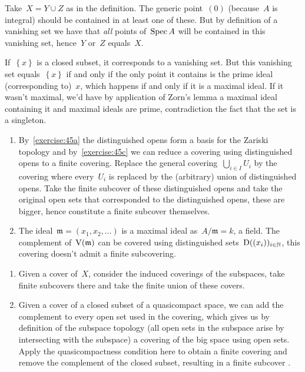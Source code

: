 \begin{exercise}
  Take~$X=Y\cup Z$ as in the definition. The generic point~$(0)$ (because~$A$ is integral) should be contained in at least one of these. But by definition of a vanishing set we have that \emph{all} points of~$\operatorname{Spec} A$ will be contained in this vanishing set, hence~$Y$ or~$Z$ equals~$X$.
\end{exercise}

\begin{exercise}
  If~$\left\{ x \right\}$ is a closed subset, it corresponds to a vanishing set. But this vanishing set equals~$\left\{ x \right\}$ if and only if the only point it contains is the prime ideal (corresponding to)~$x$, which happens if and only if it is a maximal ideal. If it wasn't maximal, we'd have by application of Zorn's lemma a maximal ideal containing it and maximal ideals are prime, contradiction the fact that the set is a singleton.
\end{exercise}

\begin{exercise}
  \label{exercise:46d}
  \begin{enumerate}
    \item By~\autoref{exercise:45a} the distinguished opens form a basis for the Zariski topology and by~\autoref{exercise:45c} we can reduce a covering using distinguished opens to a finite covering. Replace the general covering~$\bigcup_{i\in I}U_i$ by the covering where every~$U_i$ is replaced by the (arbitrary) union of distinguished opens. Take the finite subcover of these distinguished opens and take the original open sets that corresponded to the distinguished opens, these are bigger, hence constitute a finite subcover themselves.

    \item\label{enumerate:46d-b} The ideal~$\mathfrak{m}=(x_1,x_2,\ldots)$ is a maximal ideal as~$A/\mathfrak{m}=k$, a field. The complement of~$\operatorname{V}(\mathfrak{m})$ can be covered using distinguished sets~$\operatorname{D}((x_i))_{i\in\mathbb{N}}$, this covering doesn't admit a finite subcovering.
  \end{enumerate}
\end{exercise}

\begin{exercise}
  \begin{enumerate}
    \item Given a cover of~$X$, consider the induced coverings of the subspaces, take finite subcovers there and take the finite union of these covers.

    \item Given a cover of a closed subset of a quasicompact space, we can add the complement to every open set used in the covering, which gives us by definition of the subspace topology (all open sets in the subspace arise by intersecting with the subspace) a covering of the big space using open sets. Apply the quasicompactness condition here to obtain a finite covering and remove the complement of the closed subset, resulting in a finite subcover .
  \end{enumerate}
\end{exercise}

